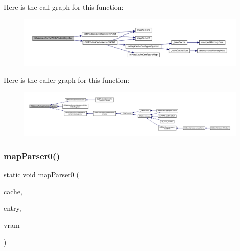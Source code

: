 Here is the call graph for this function\+:
\nopagebreak
\begin{figure}[H]
\begin{center}
\leavevmode
\includegraphics[width=350pt]{gba_2renderers_2cache-set_8c_adb3ad772576f4872cf21d2ad0867830b_cgraph}
\end{center}
\end{figure}
Here is the caller graph for this function\+:
\nopagebreak
\begin{figure}[H]
\begin{center}
\leavevmode
\includegraphics[width=350pt]{gba_2renderers_2cache-set_8c_adb3ad772576f4872cf21d2ad0867830b_icgraph}
\end{center}
\end{figure}
\mbox{\label{gba_2renderers_2cache-set_8c_a51851b87bae33cac8355b4eedb326a96}} 
\subsubsection{\texorpdfstring{map\+Parser0()}{mapParser0()}}
{\footnotesize\ttfamily static void map\+Parser0 (\begin{DoxyParamCaption}\item[{struct m\+Map\+Cache $\ast$}]{cache,  }\item[{struct m\+Map\+Cache\+Entry $\ast$}]{entry,  }\item[{void $\ast$}]{vram }\end{DoxyParamCaption})\hspace{0.3cm}{\ttfamily [static]}}

